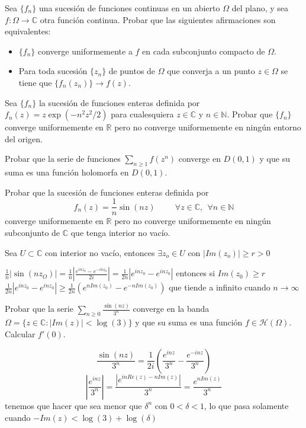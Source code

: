 \begin{ejer}
	Sea $\{f_n\}$ una sucesión de funciones continuas en un abierto $\Omega$ del plano, y sea $f:\Omega\rightarrow\mathbb{C}$ otra función continua. Probar que las siguientes afirmaciones son equivalentes:
	\begin{itemize}
		\item $\{f_n\}$ converge uniformemente a $f$ en cada subconjunto compacto de $\Omega$.
		\item Para toda sucesión $\{z_n\}$ de puntos de $\Omega$ que converja a un punto $z\in\Omega$ se tiene que $\{f_n(z_n)\}\rightarrow f(z)$.
	\end{itemize}
\end{ejer}

\begin{ejer}
	Sea $\{f_n\}$ la sucesión de funciones enteras definida por $f_n(z) = z\exp(-n^2z^2/2)$ para cualesquiera $z\in\mathbb{C}$ y $n\in\mathbb{N}$. Probar que $\{f_n\}$ converge uniformemente en $\mathbb{R}$ pero no converge uniformemente en ningún entorno del origen.
\end{ejer}

\begin{ejer}
	Probar que la serie de funciones $\sum_{n\geq 1} f(z^n)$ converge en $D(0,1)$ y que su suma es una función holomorfa en $D(0,1)$.
\end{ejer}

\begin{ejer}
	Probar que la sucesión de funciones enteras definida por
	$$ f_n(z) = \frac{1}{n}\sin(nz) \hspace{1cm} \forall z\in\mathbb{C}, \ \ \forall n\in\mathbb{N} $$
	converge uniformemente en $\mathbb{R}$ pero no converge uniformemente en ningún subconjunto de $\mathbb{C}$ que tenga interior no vacío.
\end{ejer}
\begin{sol}
Sea $U\subset \mathbb{C}$ con interior no vacío, entonces $\exists z_o\in U$ con $|Im(z_o)| \geq r > 0$

$\frac{1}{n}|\sin(nz_O)| = \frac{1}{n}\left| \frac{e^{inz_0}-e^{-inz_0}}{2i} \right|= \frac{1}{2n} \left| e^{inz_0} - e^{inz_0} \right| $
entonces si $Im(z_0)\geq r$
$\frac{1}{2n} \left| e^{inz_0} - e^{inz_0} \right|  \geq \frac{1}{2n} \left( e^{nIm(z_0)} -e^{-nIm(z_0)} \right)  $
que tiende a infinito cuando $n\rightarrow\infty$
\end{sol}

\begin{ejer}
	Probar que la serie $\sum_{n\geq 0} \frac{\sin(nz)}{3^n}$ converge en la banda $\Omega = \{ z\in\mathbb{C} : |Im(z)|<\log(3) \}$ y que su suma es una función $f\in\mathcal{H}(\Omega)$. Calcular $f'(0)$.
\end{ejer}
\begin{sol}

$$\frac{\sin(nz)}{3^n} = \frac{1}{2i} \left( \frac{e^{inz}}{3^n} - \frac{e^{-inz}}{3^n} \right)$$
$$\left| \frac{e^{inz}}{3^n} \right| = \frac{|e^{inRe(z)-nIm(z)}|}{3^n} = \frac{e^{nIm(z)}}{3^n}$$
tenemos que hacer que sea menor que $\delta^n$ con $0<\delta<1$, lo que pasa solamente cuando $-Im(z) < \log(3)+\log(\delta)$
\end{sol}

